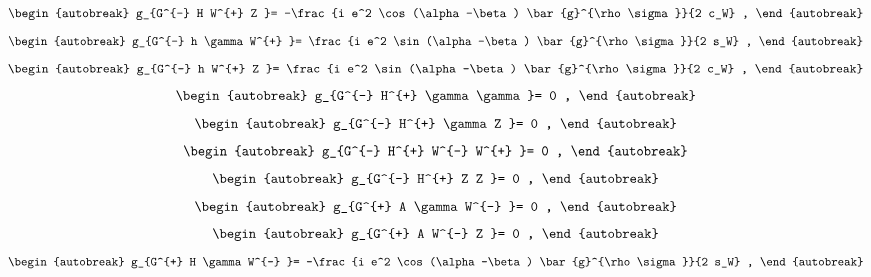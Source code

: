 \begin{align}
\begin{autobreak}
g_{G^{-} H W^{+} Z }=
	-\frac{i e^2 \cos (\alpha -\beta ) \bar{g}^{\rho \sigma }}{2 c_W}
	,
\end{autobreak}
\end{align}
\begin{align}
\begin{autobreak}
g_{G^{-} h \gamma W^{+} }=
	\frac{i e^2 \sin (\alpha -\beta ) \bar{g}^{\rho \sigma }}{2 s_W}
	,
\end{autobreak}
\end{align}
\begin{align}
\begin{autobreak}
g_{G^{-} h W^{+} Z }=
	\frac{i e^2 \sin (\alpha -\beta ) \bar{g}^{\rho \sigma }}{2 c_W}
	,
\end{autobreak}
\end{align}
\begin{align}
\begin{autobreak}
g_{G^{-} H^{+} \gamma \gamma }=
	0
	,
\end{autobreak}
\end{align}
\begin{align}
\begin{autobreak}
g_{G^{-} H^{+} \gamma Z }=
	0
	,
\end{autobreak}
\end{align}
\begin{align}
\begin{autobreak}
g_{G^{-} H^{+} W^{-} W^{+} }=
	0
	,
\end{autobreak}
\end{align}
\begin{align}
\begin{autobreak}
g_{G^{-} H^{+} Z Z }=
	0
	,
\end{autobreak}
\end{align}
\begin{align}
\begin{autobreak}
g_{G^{+} A \gamma W^{-} }=
	0
	,
\end{autobreak}
\end{align}
\begin{align}
\begin{autobreak}
g_{G^{+} A W^{-} Z }=
	0
	,
\end{autobreak}
\end{align}
\begin{align}
\begin{autobreak}
g_{G^{+} H \gamma W^{-} }=
	-\frac{i e^2 \cos (\alpha -\beta ) \bar{g}^{\rho \sigma }}{2 s_W}
	,
\end{autobreak}
\end{align}
